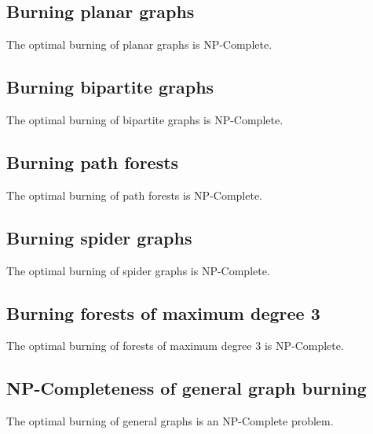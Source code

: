 \subsection{Burning planar graphs}\label{subsection:burn-planar-graphs}

\begin{corollary}
    The optimal burning of planar graphs is NP-Complete.
\end{corollary}

\subsection{Burning bipartite graphs}\label{subsection:burn-bipartite-graphs}

\begin{corollary}
    The optimal burning of bipartite graphs is NP-Complete.
\end{corollary}

\subsection{Burning path forests}\label{subsection:burn-path-forests}

\begin{corollary}
    The optimal burning of path forests is NP-Complete.
\end{corollary}

\subsection{Burning spider graphs}\label{subsection:burn-spider-graphs}

\begin{corollary}
    The optimal burning of spider graphs is NP-Complete.
\end{corollary}

\subsection{Burning forests of maximum degree 3}\label{subsection:burn-forests}

\begin{corollary}
    The optimal burning of forests of maximum degree $3$ is NP-Complete.
\end{corollary}

\subsection{NP-Completeness of general graph burning}\label{subsection:burn-general-graphs-NPC}

\begin{corollary}\label{corollary:burn-general-graphs-NPC}
    The optimal burning of general graphs is an NP-Complete problem.
\end{corollary}

% 
